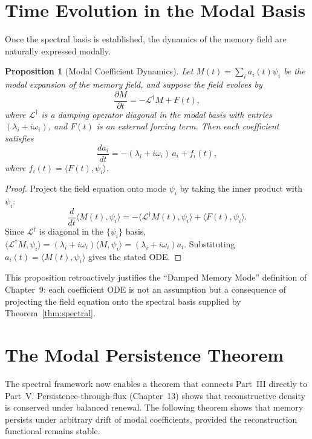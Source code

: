 \documentclass[12pt, oneside]{book}
\theoremstyle{plain}
\newtheorem{proposition}[theorem]{Proposition}
\theoremstyle{definition}
\theoremstyle{remark}
\begin{document}
\section{Time Evolution in the Modal Basis}

Once the spectral basis is established, the dynamics of
the memory field are naturally expressed modally.

\begin{proposition}[Modal Coefficient Dynamics]
\label{prop:modal-dyn}
Let $M(t) = \sum_i a_i(t)\psi_i$ be the modal expansion
of the memory field, and suppose the field evolves by
\[
  \frac{\partial M}{\partial t}
  = -\mathcal{L}^\dagger M + F(t),
\]
where $\mathcal{L}^\dagger$ is a damping operator diagonal
in the modal basis with entries $(\lambda_i + i\omega_i)$,
and $F(t)$ is an external forcing term.
Then each coefficient satisfies
\[
  \frac{d a_i}{dt}
  = -(\lambda_i + i\omega_i)\,a_i + f_i(t),
\]
where $f_i(t) = \langle F(t), \psi_i\rangle$.
\end{proposition}

\begin{proof}
Project the field equation onto mode $\psi_i$ by taking
the inner product with $\psi_i$:
\[
  \frac{d}{dt}\langle M(t), \psi_i\rangle
  = -\langle \mathcal{L}^\dagger M(t), \psi_i\rangle
    + \langle F(t), \psi_i\rangle.
\]
Since $\mathcal{L}^\dagger$ is diagonal in the $\{\psi_i\}$
basis, $\langle \mathcal{L}^\dagger M, \psi_i\rangle
= (\lambda_i + i\omega_i)\langle M, \psi_i\rangle
= (\lambda_i + i\omega_i)a_i$.
Substituting $a_i(t) = \langle M(t), \psi_i\rangle$ gives
the stated ODE.
\end{proof}

This proposition retroactively justifies the
``Damped Memory Mode'' definition of Chapter~9: each
coefficient ODE is not an assumption but a consequence of
projecting the field equation onto the spectral basis
supplied by Theorem~\ref{thm:spectral}.

\section{The Modal Persistence Theorem}

The spectral framework now enables a theorem that connects
Part~III directly to Part~V.
Persistence-through-flux (Chapter~13) shows that
reconstructive density is conserved under balanced renewal.
The following theorem shows that memory persists under
arbitrary drift of modal coefficients, provided the
reconstruction functional remains stable.
\end{document}
